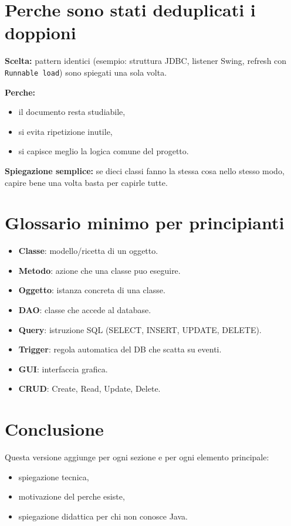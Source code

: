 \documentclass[12pt,a4paper]{article}
\begin{document}
\section{Perche sono stati deduplicati i doppioni}
\textbf{Scelta:} pattern identici (esempio: struttura JDBC, listener Swing, refresh con \texttt{Runnable load}) sono spiegati una sola volta.

\textbf{Perche:}
\begin{itemize}
  \item il documento resta studiabile,
  \item si evita ripetizione inutile,
  \item si capisce meglio la logica comune del progetto.
\end{itemize}

\textbf{Spiegazione semplice:}
se dieci classi fanno la stessa cosa nello stesso modo, capire bene una volta basta per capirle tutte.

\section{Glossario minimo per principianti}
\begin{itemize}
  \item \textbf{Classe}: modello/ricetta di un oggetto.
  \item \textbf{Metodo}: azione che una classe puo eseguire.
  \item \textbf{Oggetto}: istanza concreta di una classe.
  \item \textbf{DAO}: classe che accede al database.
  \item \textbf{Query}: istruzione SQL (SELECT, INSERT, UPDATE, DELETE).
  \item \textbf{Trigger}: regola automatica del DB che scatta su eventi.
  \item \textbf{GUI}: interfaccia grafica.
  \item \textbf{CRUD}: Create, Read, Update, Delete.
\end{itemize}

\section{Conclusione}
Questa versione aggiunge per ogni sezione e per ogni elemento principale:
\begin{itemize}
  \item spiegazione tecnica,
  \item motivazione del perche esiste,
  \item spiegazione didattica per chi non conosce Java.
\end{itemize}
\end{document}
